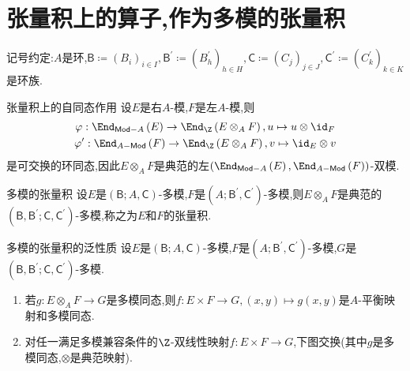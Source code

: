 \section{张量积上的算子,作为多模的张量积}

记号约定:$A$是环,$\mathsf{B}\coloneq\left(B_{i}\right)_{i\in I},\mathsf{B}^{\prime}\coloneq\left(B_{h}^{\prime}\right)_{h\in H},\mathsf{C}\coloneq\left(C_{j}\right)_{j\in J},\mathsf{C}^{\prime}\coloneq\left(C_{k}^{\prime}\right)_{k\in K}$是环族.

\begin{proposition}{张量积上的自同态作用}{}
	设$E$是右$A$-模,$F$是左$A$-模,则
	\begin{gather*}
		\varphi:\End_{\mathsf{Mod}-A}\left(E\right)\to\End_{\Z}\left(E\otimes_{A}F\right),u\mapsto u\otimes\id_{F}\\
		\varphi^{\prime}:\End_{A-\mathsf{Mod}}\left(F\right)\to\End_{\Z}\left(E\otimes_{A}F\right),v\mapsto \id_{E}\otimes v
	\end{gather*}
	是可交换的环同态,因此$E\otimes_{A}F$是典范的左$\left(\End_{\mathsf{Mod}-A}\left(E\right),\End_{A-\mathsf{Mod}}\left(F\right)\right)$-双模.
\end{proposition}

\begin{definition}{多模的张量积}{}
	设$E$是$\left(\mathsf{B};A,\mathsf{C}\right)$-多模,$F$是$\left(A;\mathsf{B}^{\prime},\mathsf{C}^{\prime}\right)$-多模,则$E\otimes_{A}F$是典范的$\left(\mathsf{B},\mathsf{B}^{\prime};\mathsf{C},\mathsf{C}^{\prime}\right)$-多模,称之为$E$和$F$的张量积.
\end{definition}

\begin{proposition}{多模的张量积的泛性质}{}
	设$E$是$\left(\mathsf{B};A,\mathsf{C}\right)$-多模,$F$是$\left(A;\mathsf{B}^{\prime},\mathsf{C}^{\prime}\right)$-多模,$G$是$\left(\mathsf{B},\mathsf{B}^{\prime};\mathsf{C},\mathsf{C}^{\prime}\right)$-多模.
	\begin{enumerate}
		\item 若$g:E\otimes_{A}F\to G$是多模同态,则$f:E\times F\to G,\left(x,y\right)\mapsto g\left(x,y\right)$是$A$-平衡映射和多模同态.
		\item 对任一满足多模兼容条件的$\Z$-双线性映射$f:E\times F\to G$,下图交换(其中$g$是多模同态,$\otimes$是典范映射).
		\begin{center}
		\end{center}
	\end{enumerate}
\end{proposition}

